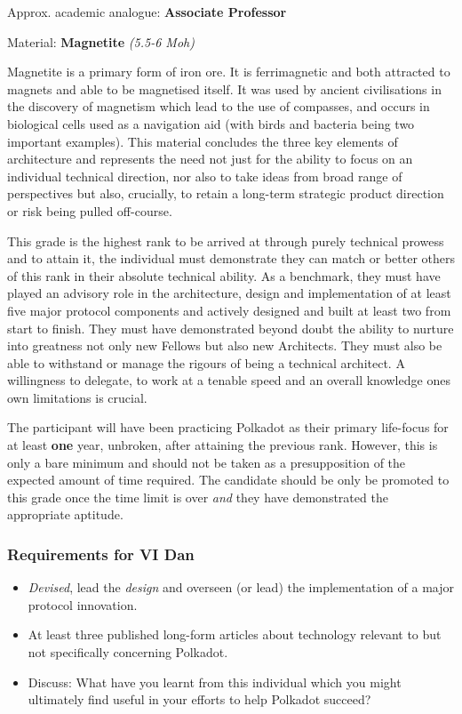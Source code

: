 \documentclass[9pt,oneside]{amsart}
\begin{document}
Approx. academic analogue: \textbf{Associate Professor}

Material: \textbf{Magnetite} \emph{(5.5-6 Moh)}

Magnetite is a primary form of iron ore. It is ferrimagnetic and both attracted to magnets and able to be magnetised itself. It was used by ancient civilisations in the discovery of magnetism which lead to the use of compasses, and occurs in biological cells used as a navigation aid (with birds and bacteria being two important examples). This material concludes the three key elements of architecture and represents the need not just for the ability to focus on an individual technical direction, nor also to take ideas from broad range of perspectives but also, crucially, to retain a long-term strategic product direction or risk being pulled off-course.

This grade is the highest rank to be arrived at through purely technical prowess and to attain it, the individual must demonstrate they can match or better others of this rank in their absolute technical ability. As a benchmark, they must have played an advisory role in the architecture, design and implementation of at least five major protocol components and actively designed and built at least two from start to finish. They must have demonstrated beyond doubt the ability to nurture into greatness not only new Fellows but also new Architects. They must also be able to withstand or manage the rigours of being a technical architect. A willingness to delegate, to work at a tenable speed and an overall knowledge ones own limitations is crucial.

The participant will have been practicing Polkadot as their primary life-focus for at least \textbf{one} year, unbroken, after attaining the previous rank. However, this is only a bare minimum and should not be taken as a presupposition of the expected amount of time required. The candidate should be only be promoted to this grade once the time limit is over \emph{and} they have demonstrated the appropriate aptitude.

\subsubsection{Requirements for VI Dan}\label{requirements-6}

\begin{itemize}
\item \emph{Devised}, lead the \emph{design} and overseen (or lead) the implementation of a major protocol innovation.
\item At least three published long-form articles about technology relevant to but not specifically concerning Polkadot.
\item Discuss: What have you learnt from this individual which you might ultimately find useful in your efforts to help Polkadot succeed?
\end{itemize}
\end{document}
